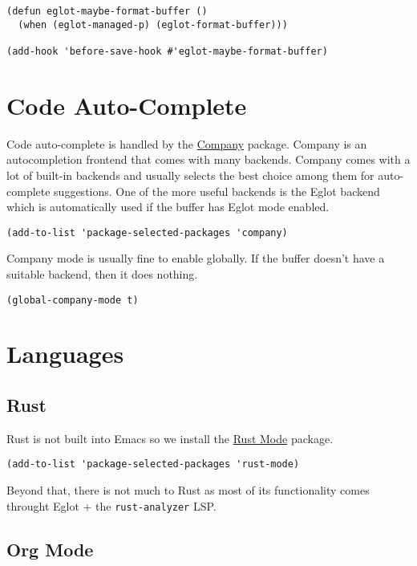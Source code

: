 \documentclass[11pt]{article}
\begin{document}
\begin{verbatim}
(defun eglot-maybe-format-buffer ()
  (when (eglot-managed-p) (eglot-format-buffer)))

(add-hook 'before-save-hook #'eglot-maybe-format-buffer)
\end{verbatim}
\section{Code Auto-Complete}
\label{sec:org74b51ac}

Code auto-complete is handled by the \href{https://company-mode.github.io/}{Company} package. Company is an
autocompletion frontend that comes with many backends. Company comes with a lot
of built-in backends and usually selects the best choice among them for
auto-complete suggestions. One of the more useful backends is the Eglot backend
which is automatically used if the buffer has Eglot mode enabled.

\begin{verbatim}
(add-to-list 'package-selected-packages 'company)
\end{verbatim}

Company mode is usually fine to enable globally. If the buffer doesn't have a
suitable backend, then it does nothing.

\begin{verbatim}
(global-company-mode t)
\end{verbatim}
\section{Languages}
\label{sec:orge798ac9}

\subsection{Rust}
\label{sec:org7043f8e}

Rust is not built into Emacs so we install the \href{https://github.com/rust-lang/rust-mode/tree/25d91cff281909e9b7cb84e31211c4e7b0480f94}{Rust Mode} package.

\begin{verbatim}
(add-to-list 'package-selected-packages 'rust-mode)
\end{verbatim}

Beyond that, there is not much to Rust as most of its functionality comes
throught Eglot + the \texttt{rust-analyzer} LSP.
\subsection{Org Mode}
\label{sec:org26ea189}
\end{document}
